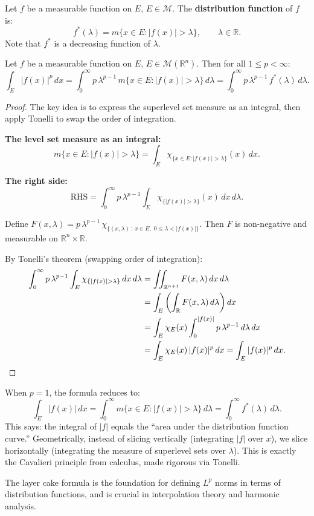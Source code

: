 \documentclass[11pt]{report}
\begin{document}
\begin{defbox}
Let $f$ be a measurable function on $E$, $E \in \mathcal{M}$. The \textbf{distribution function} of $f$ is:
\[
f^*(\lambda) = m\{x \in E : |f(x)| > \lambda\}, \qquad \lambda \in \mathbb{R}.
\]
Note that $f^*$ is a decreasing function of $\lambda$.
\end{defbox}

\begin{thmbox}
Let $f$ be a measurable function on $E$, $E \in \mathcal{M}(\mathbb{R}^n)$. Then for all $1 \leq p < \infty$:
\[
\int_E |f(x)|^p\,dx = \int_0^{\infty} p\,\lambda^{p-1}\,m\{x \in E : |f(x)| > \lambda\}\,d\lambda = \int_0^{\infty} p\,\lambda^{p-1}\,f^*(\lambda)\,d\lambda.
\]
\end{thmbox}

\begin{proof}
The key idea is to express the superlevel set measure as an integral, then apply Tonelli to swap the order of integration.

\textbf{The level set measure as an integral:}
\[
m\{x \in E : |f(x)| > \lambda\} = \int_E \chi_{\{x \in E : |f(x)| > \lambda\}}(x)\,dx.
\]

\textbf{The right side:}
\[
\text{RHS} = \int_0^{\infty} p\,\lambda^{p-1} \int_E \chi_{\{|f(x)| > \lambda\}}(x)\,dx\,d\lambda.
\]

Define $F(x, \lambda) = p\,\lambda^{p-1}\,\chi_{\{(x, \lambda)\,:\, x \in E,\; 0 \leq \lambda < |f(x)|\}}$. Then $F$ is non-negative and measurable on $\mathbb{R}^n \times \mathbb{R}$.

By Tonelli's theorem (swapping order of integration):
\begin{align*}
\int_0^{\infty} p\,\lambda^{p-1} \int_E \chi_{\{|f(x)| > \lambda\}}\,dx\,d\lambda &= \iint_{\mathbb{R}^{n+1}} F(x, \lambda)\,dx\,d\lambda \\
&= \int_E \left(\int_{\mathbb{R}} F(x, \lambda)\,d\lambda\right) dx \\
&= \int_E \chi_E(x) \int_0^{|f(x)|} p\,\lambda^{p-1}\,d\lambda\,dx \\
&= \int_E \chi_E(x)\,|f(x)|^p\,dx = \int_E |f(x)|^p\,dx. \qedhere
\end{align*}
\end{proof}

\begin{rembox}[Interpretation]
When $p = 1$, the formula reduces to:
\[
\int_E |f(x)|\,dx = \int_0^{\infty} m\{x \in E : |f(x)| > \lambda\}\,d\lambda = \int_0^{\infty} f^*(\lambda)\,d\lambda.
\]
This says: the integral of $|f|$ equals the ``area under the distribution function curve.'' Geometrically, instead of slicing vertically (integrating $|f|$ over $x$), we slice horizontally (integrating the measure of superlevel sets over $\lambda$). This is exactly the Cavalieri principle from calculus, made rigorous via Tonelli.

The layer cake formula is the foundation for defining $L^p$ norms in terms of distribution functions, and is crucial in interpolation theory and harmonic analysis.
\end{rembox}
\end{document}
